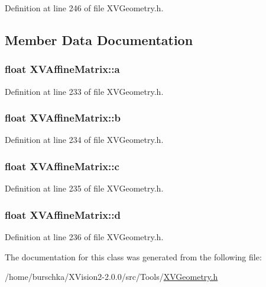 Definition at line 246 of file XVGeometry.h.

\subsection{Member Data Documentation}
\label{XVAffineMatrix_m0}
\hypertarget{class_XVAffineMatrix_m0}{
\subsubsection[a]{\setlength{\rightskip}{0pt plus 5cm}float XVAffine\-Matrix::a}}




Definition at line 233 of file XVGeometry.h.\label{XVAffineMatrix_m1}
\hypertarget{class_XVAffineMatrix_m1}{
\subsubsection[b]{\setlength{\rightskip}{0pt plus 5cm}float XVAffine\-Matrix::b}}




Definition at line 234 of file XVGeometry.h.\label{XVAffineMatrix_m2}
\hypertarget{class_XVAffineMatrix_m2}{
\subsubsection[c]{\setlength{\rightskip}{0pt plus 5cm}float XVAffine\-Matrix::c}}




Definition at line 235 of file XVGeometry.h.\label{XVAffineMatrix_m3}
\hypertarget{class_XVAffineMatrix_m3}{
\subsubsection[d]{\setlength{\rightskip}{0pt plus 5cm}float XVAffine\-Matrix::d}}




Definition at line 236 of file XVGeometry.h.

The documentation for this class was generated from the following file:\begin{CompactItemize}
\item 
/home/burschka/XVision2-2.0.0/src/Tools/\hyperlink{XVGeometry.h-source}{XVGeometry.h}\end{CompactItemize}
